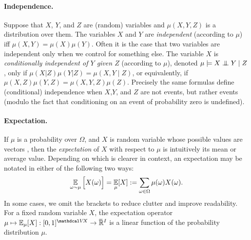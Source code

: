 \paragraph{%
    Independence.} 
Suppose that $X$, $Y$, and $Z$ are (random) variables and $\mu(X,Y,Z)$ is a distribution over them.
The variables $X$ and $Y$ are \emph{independent} (according to $\mu$) iff $\mu(X,Y) = \mu(X)\mu(Y)$.
Often it is the case that two variables are independent only when we control for something else.
The variable ${X}$ is \emph{conditionally independent of ${Y}$ given ${Z}$} 
(according to $\mu$),  denoted 
$\mu \models {X} \mathrel{\perp\mspace{-10mu}\perp} {Y} \mid {Z}$, 
only if $\mu(X | Z) \mu(Y | Z) = \mu(X,Y \mid Z)$,
or equivalently, if
$\mu(X,Z) \mu(Y,Z) = \mu(X,Y,Z) \mu(Z)$. 
Precisely the same formulas define (conditional) independence
    when $X$,$Y$, and $Z$ are not events, but rather events
    (modulo the fact that conditioning on an event of probability zero is undefined).





\paragraph{Expectation.%
    } 
If $\mu$ is a probability over $\Omega$, and $X$ is random variable 
whose possible values are vectors 
\unskip, then the \emph{expectation} of $X$ with respect to $\mu$ is intuitively its mean or average value.
Depending on which is clearer in context, 
    an expectation may be notated in either of the following two ways:
\[
    \operatorname*{\mathbb{E}}_{\omega \sim \mu} \Big[ X(\omega) \Big]
        = \operatorname*{\mathbb{E}}_{\mu}[ X ]  
        := \sum_{\omega \in \Omega} \mu(\omega) X(\omega).
\]
In some cases, we omit the brackets to reduce clutter and improve readability.
For a fixed random variable $X$, the expectation operator $\mu \mapsto \Ex_\mu[X] : [0,1]^{\V\! X} \to \Rext^I$ is a linear function of the probability distribution $\mu$.


